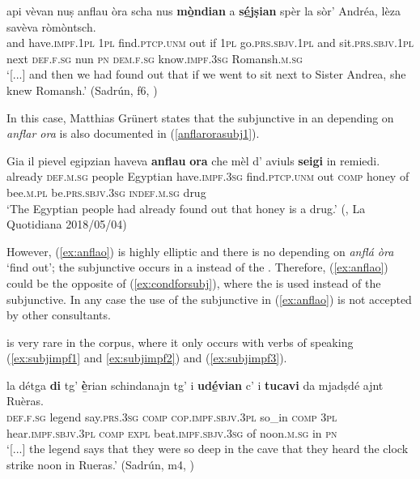 \ea
\label{ex:anflao}
\gll   [...] api vèvan nuṣ anflau òra scha nus \textbf{mò̱ndian} a \textbf{sé̱jṣian} spèr la sòr’ Andréa, lèza savèva ròmòntsch.\\
{} and have.\textsc{impf.1pl} \textsc{1pl}  find.\textsc{ptcp.unm} out if \textsc{1pl} go.\textsc{prs.sbjv.1pl} and sit.\textsc{prs.sbjv.1pl} next  \textsc{def.f.sg} nun \textsc{pn} \textsc{dem.f.sg} know.\textsc{impf.3sg} Romansh.\textsc{m.sg}\\
\glt `[...] and then we had found out that if we went to sit next to Sister Andrea, she knew Romansh.' (Sadrún, f6, )
\z

In this case, Matthias Grünert states that the subjunctive in an  depending on \textit{anflar ora} is also documented in  (\ref{anflarorasubj1}).

\ea
\label{anflarorasubj1}
\gll Gia il pievel egipzian haveva \textbf{anflau} \textbf{ora} che mèl d’ aviuls \textbf{seigi} in remiedi.\\
already \textsc{def.m.sg} people Egyptian have.\textsc{impf.3sg} find.\textsc{ptcp.unm} out \textsc{comp} honey of bee.\textsc{m.pl} be.\textsc{prs.sbjv.3sg} \textsc{indef.m.sg} drug\\
\glt `The Egyptian people had already found out that honey is a drug.' (, La Quotidiana 2018/05/04)
\z


However, (\ref{ex:anflao}) is highly elliptic and there is no  depending on \textit{ anflá òra} `find out'; the subjunctive occurs in a  instead of the . Therefore, (\ref{ex:anflao}) could be the opposite of (\ref{ex:condforsubj}), where the  is used instead of the subjunctive. In any case the use of the subjunctive in (\ref{ex:anflao}) is not accepted by other consultants.

\label{sec:4.1.2.2.9}
 is very rare in the corpus, where it only occurs with verbs of speaking (\ref{ex:subjimpf1} and \ref{ex:subjimpf2}) and  (\ref{ex:subjimpf3}).

\ea
\label{ex:subjimpf1}
\gll [...] la détga \textbf{di} tg’ {\textbf è̱rian} schindanajn tg' i \textbf{udé̱vian} c’ i \textbf{tucavi} da mjadṣdé ajnt Ruèras.\\
{} \textsc{def.f.sg} legend say.\textsc{prs.3sg}  \textsc{comp} \textsc{cop.impf.sbjv.3pl} so\_in \textsc{comp} \textsc{3pl} hear.\textsc{impf.sbjv.3pl} \textsc{comp} \textsc{expl} beat.\textsc{impf.sbjv.3sg} of noon.\textsc{m.sg} in \textsc{pn}\\
\glt `[...] the legend says that they were so deep in the cave that they heard the clock strike noon in Rueras.' (Sadrún, m4, )
\z

